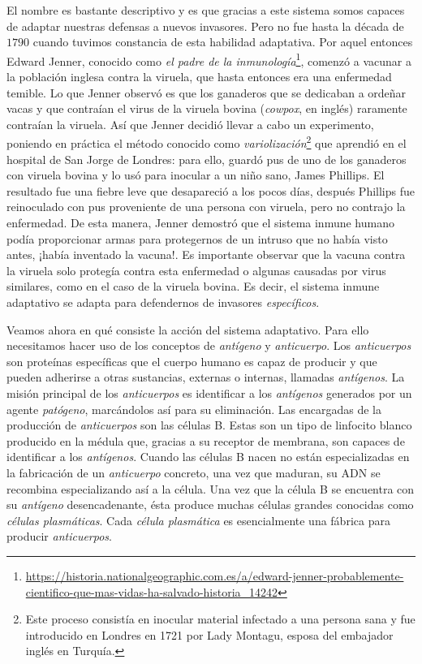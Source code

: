 El nombre es bastante descriptivo y es que gracias a este sistema somos capaces de adaptar nuestras defensas a nuevos invasores. Pero no fue hasta la década de $1790$ cuando tuvimos constancia de esta habilidad adaptativa. Por aquel entonces Edward Jenner, conocido como \textit{el padre de la inmunología}\footnote{\url{https://historia.nationalgeographic.com.es/a/edward-jenner-probablemente-cientifico-que-mas-vidas-ha-salvado-historia_14242}}, comenzó a vacunar a la población inglesa contra la viruela, que hasta entonces era una enfermedad temible. Lo que Jenner observó es que los ganaderos que se dedicaban a ordeñar vacas y que contraían el virus de la viruela bovina (\textit{cowpox}, en inglés) raramente contraían la viruela. Así que Jenner decidió llevar a cabo un experimento, poniendo en práctica el método conocido como \textit{variolización}\footnote{Este proceso consistía en inocular material infectado a una persona sana y fue introducido en Londres en 1721 por  Lady Montagu, esposa del embajador inglés en Turquía.} que aprendió en el hospital de San Jorge de Londres: para ello, guardó pus de uno de los ganaderos con viruela bovina y lo usó para inocular a un niño sano, James Phillips. El resultado fue una fiebre leve que desapareció a los pocos días, después Phillips fue reinoculado con pus proveniente de una persona con viruela, pero no contrajo la enfermedad. De esta manera, Jenner demostró que el sistema inmune humano podía proporcionar armas para protegernos de un intruso que no había visto antes, ¡había inventado la vacuna!. Es importante observar que la vacuna contra la viruela solo protegía contra esta enfermedad o algunas causadas por virus similares, como en el caso de la viruela bovina. Es decir, el sistema inmune adaptativo se adapta para defendernos de invasores \textit{específicos}. 

Veamos ahora en qué consiste la acción del sistema adaptativo. Para ello necesitamos hacer uso de los conceptos de \textit{antígeno} y \textit{anticuerpo}. Los \textit{anticuerpos} son proteínas específicas que el cuerpo humano es capaz de producir y que pueden adherirse a otras sustancias, externas o internas, llamadas \textit{antígenos}. La misión principal de los \textit{anticuerpos} es identificar a los \textit{antígenos} generados por un agente \textit{patógeno}, marcándolos así para su eliminación. Las encargadas de la producción de \textit{anticuerpos} son las células B. Estas son un tipo de linfocito blanco producido en la médula que, gracias a su receptor de membrana, son capaces de identificar a los \textit{antígenos}. Cuando las células B nacen no están especializadas en la fabricación de un \textit{anticuerpo} concreto, una vez que maduran, su ADN se recombina especializando así a la célula. Una vez que la célula B se encuentra con su \textit{antígeno} desencadenante, ésta produce muchas células grandes conocidas como \textit{células plasmáticas}. Cada \textit{célula plasmática} es esencialmente una fábrica para producir \textit{anticuerpos}. %

